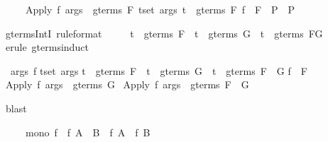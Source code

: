 \begin{isabellebody}
\begin{isamarkuptext}
\begin{isabelle}%
\ \ \ \ \ {\isasymlbrakk}Apply\ f\ args\ {\isasymin}\ gterms\ F{\isacharsemicolon}\ {\isasymlbrakk}{\isasymforall}t{\isasymin}set\ args{\isachardot}\ t\ {\isasymin}\ gterms\ F{\isacharsemicolon}\ f\ {\isasymin}\ F{\isasymrbrakk}\ {\isasymLongrightarrow}\ P{\isasymrbrakk}\ {\isasymLongrightarrow}\ P%
\end{isabelle}
%
\end{isamarkuptext}%
\ gterms{\isacharunderscore}IntI\ {\isacharbrackleft}rule{\isacharunderscore}format{\isacharbrackright}{\isacharcolon}\isanewline
\ \ \ \ \ {\isachardoublequote}t\ {\isasymin}\ gterms\ F\ {\isasymLongrightarrow}\ t\ {\isasymin}\ gterms\ G\ {\isasymlongrightarrow}\ t\ {\isasymin}\ gterms\ {\isacharparenleft}F{\isasyminter}G{\isacharparenright}{\isachardoublequote}\isanewline
{}\ {\isacharparenleft}erule\ gterms{\isachardot}induct{\isacharparenright}%
\begin{isamarkuptxt}%
\begin{isabelle}%
\ {}{\isachardot}\ {\isasymAnd}args\ f{\isachardot}\isanewline
{}t{\isasymin}set\ args{\isachardot}\isanewline
{}t\ {\isasymin}\ gterms\ F\ {\isasymand}\ {\isacharparenleft}t\ {\isasymin}\ gterms\ G\ {\isasymlongrightarrow}\ t\ {\isasymin}\ gterms\ {\isacharparenleft}F\ {\isasyminter}\ G{\isacharparenright}{\isacharparenright}{\isacharsemicolon}\isanewline
{}f\ {\isasymin}\ F{\isasymrbrakk}\isanewline
{}\ Apply\ f\ args\ {\isasymin}\ gterms\ G\ {\isasymlongrightarrow}\isanewline
{}Apply\ f\ args\ {\isasymin}\ gterms\ {\isacharparenleft}F\ {\isasyminter}\ G{\isacharparenright}%
\end{isabelle}%
\end{isamarkuptxt}%
\ blast\isanewline
{}%
\begin{isamarkuptext}%
\begin{isabelle}%
\ \ \ \ \ mono\ f\ {\isasymLongrightarrow}\ f\ {\isacharparenleft}A\ {\isasyminter}\ B{\isacharparenright}\ {\isasymsubseteq}\ f\ A\ {\isasyminter}\ f\ B%
\end{isabelle}
%
\end{isamarkuptext}%

\end{isabellebody}
